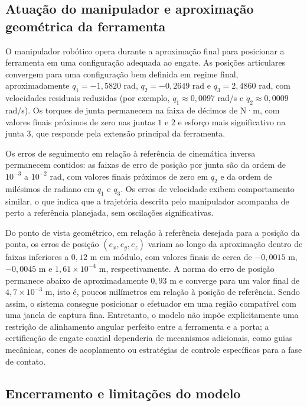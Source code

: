 \subsection{Atuação do manipulador e aproximação geométrica da ferramenta}

O manipulador robótico opera durante a aproximação final para posicionar a ferramenta em uma configuração adequada ao engate. As posições articulares convergem para uma configuração bem definida em regime final, aproximadamente $q_1 = -1{,}5820$ rad, $q_2 = -0{,}2649$ rad e $q_3 = 2{,}4860$ rad, com velocidades residuais reduzidas (por exemplo, $\dot{q}_1 \approx 0{,}0097$ rad/s e $\dot{q}_2 \approx 0{,}0009$ rad/s). Os torques de junta permanecem na faixa de décimos de N·m, com valores finais próximos de zero nas juntas $1$ e $2$ e esforço mais significativo na junta $3$, que responde pela extensão principal da ferramenta.

Os erros de seguimento em relação à referência de cinemática inversa permanecem contidos: as faixas de erro de posição por junta são da ordem de $10^{-3}$ a $10^{-2}$ rad, com valores finais próximos de zero em $q_2$ e da ordem de milésimos de radiano em $q_1$ e $q_3$. Os erros de velocidade exibem comportamento similar, o que indica que a trajetória descrita pelo manipulador acompanha de perto a referência planejada, sem oscilações significativas.

Do ponto de vista geométrico, em relação à referência desejada para a posição da ponta, os erros de posição $(e_x,e_y,e_z)$ variam ao longo da aproximação dentro de faixas inferiores a $0{,}12$ m em módulo, com valores finais de cerca de $-0{,}0015$ m, $-0{,}0045$ m e $1{,}61\times 10^{-4}$ m, respectivamente. A norma do erro de posição permanece abaixo de aproximadamente $0{,}93$ m e converge para um valor final de $4{,}7\times 10^{-3}$ m, isto é, poucos milímetros em relação à posição de referência.
Sendo assim, o sistema consegue posicionar o efetuador em uma região compatível com uma janela de captura fina. Entretanto, o modelo não impõe explicitamente uma restrição de alinhamento angular perfeito entre a ferramenta e a porta; a certificação de engate coaxial dependeria de mecanismos adicionais, como guias mecânicas, cones de acoplamento ou estratégias de controle específicas para a fase de contato.

\subsection{Encerramento e limitações do modelo}

